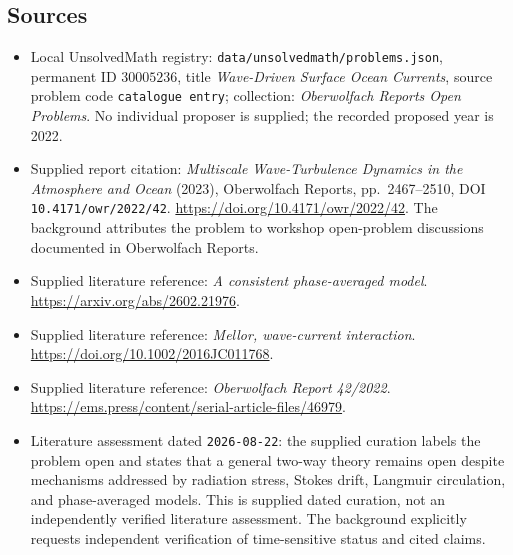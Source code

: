 \documentclass[11pt]{article}
\begin{document}
\subsection{Sources}
\begin{itemize}
\item Local UnsolvedMath registry: \texttt{data/unsolvedmath/problems.json}, permanent ID \(30005236\), title \emph{Wave-Driven Surface Ocean Currents}, source problem code \texttt{catalogue entry}; collection: \emph{Oberwolfach Reports Open Problems}. No individual proposer is supplied; the recorded proposed year is 2022.
\item Supplied report citation: \emph{Multiscale Wave-Turbulence Dynamics in the Atmosphere and Ocean} (2023), Oberwolfach Reports, pp.\ 2467--2510, DOI \texttt{10.4171/owr/2022/42}. \url{https://doi.org/10.4171/owr/2022/42}. The background attributes the problem to workshop open-problem discussions documented in Oberwolfach Reports.
\item Supplied literature reference: \emph{A consistent phase-averaged model}. \url{https://arxiv.org/abs/2602.21976}.
\item Supplied literature reference: \emph{Mellor, wave-current interaction}. \url{https://doi.org/10.1002/2016JC011768}.
\item Supplied literature reference: \emph{Oberwolfach Report 42/2022}. \url{https://ems.press/content/serial-article-files/46979}.
\item Literature assessment dated \texttt{2026-08-22}: the supplied curation labels the problem open and states that a general two-way theory remains open despite mechanisms addressed by radiation stress, Stokes drift, Langmuir circulation, and phase-averaged models. This is supplied dated curation, not an independently verified literature assessment. The background explicitly requests independent verification of time-sensitive status and cited claims.
\end{itemize}
\end{document}
